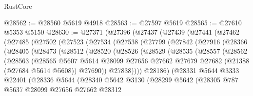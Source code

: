 \begin{lexlean}{RustCore}
\begin{coremodule}
@28562 := @28560 @5619 @4918
@28563 := @27597 @5619
@28565 := @27610 @5353 @5150
@28630 := @27371
    (@27396
      (@27437
        (@27439
          (@27441
            (@27462
              (@27485
                (@27502
                  (@27523
                    (@27534
                      (@27538
                        (@27799
                          (@27842
                            (@27916
                              (@28366
                                (@28405
                                  (@28473
                                    (@28512
                                      (@28520
                                        (@28526
                                          (@28529
                                            (@28535
                                              (@28557
                                                (@28562
                                                  (@28563
                                                    (@28565
                                                      @5607
                                                      @5614
                                                      @28099
                                                      @27656
                                                      @27662
                                                      @27679
                                                      @27682
                                                      (@21388 (@27684 @5614 @5608))
                                                      @27690))
                                                  @27838))))
                                          @28186)
                                        (@28331
                                          @5644
                                          @3333
                                          @22401
                                          (@28336
                                            @5644
                                            (@28340
                                              @5642
                                              @3130
                                              (@28299
                                                @5642
                                                (@28305
                                                  @787
                                                  @5637
                                                  @28099
                                                  @27656
                                                  @27662
                                                  @28312

\end{coremodule}
\end{lexlean}

